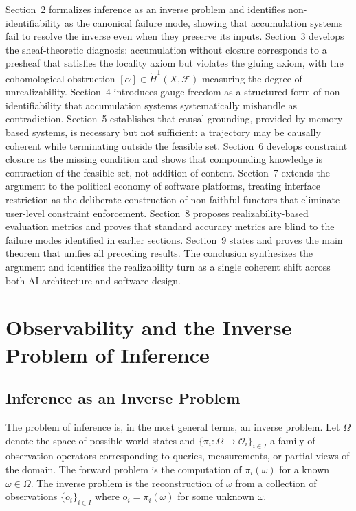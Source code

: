 \documentclass[12pt, oneside]{article}
\begin{document}
Section~2 formalizes inference as an inverse problem and identifies non-identifiability as the canonical failure mode, showing that accumulation systems fail to resolve the inverse even when they preserve its inputs. Section~3 develops the sheaf-theoretic diagnosis: accumulation without closure corresponds to a presheaf that satisfies the locality axiom but violates the gluing axiom, with the cohomological obstruction $[\alpha] \in \check{H}^1(X,\mathcal{F})$ measuring the degree of unrealizability. Section~4 introduces gauge freedom as a structured form of non-identifiability that accumulation systems systematically mishandle as contradiction. Section~5 establishes that causal grounding, provided by memory-based systems, is necessary but not sufficient: a trajectory may be causally coherent while terminating outside the feasible set. Section~6 develops constraint closure as the missing condition and shows that compounding knowledge is contraction of the feasible set, not addition of content. Section~7 extends the argument to the political economy of software platforms, treating interface restriction as the deliberate construction of non-faithful functors that eliminate user-level constraint enforcement. Section~8 proposes realizability-based evaluation metrics and proves that standard accuracy metrics are blind to the failure modes identified in earlier sections. Section~9 states and proves the main theorem that unifies all preceding results. The conclusion synthesizes the argument and identifies the realizability turn as a single coherent shift across both AI architecture and software design.

\section{Observability and the Inverse Problem of Inference}

\subsection{Inference as an Inverse Problem}

The problem of inference is, in the most general terms, an inverse problem. Let $\Omega$ denote the space of possible world-states and $\{\pi_i : \Omega \to \mathcal{O}_i\}_{i \in I}$ a family of observation operators corresponding to queries, measurements, or partial views of the domain. The forward problem is the computation of $\pi_i(\omega)$ for a known $\omega \in \Omega$. The inverse problem is the reconstruction of $\omega$ from a collection of observations $\{o_i\}_{i \in I}$ where $o_i = \pi_i(\omega)$ for some unknown $\omega$.
\end{document}

